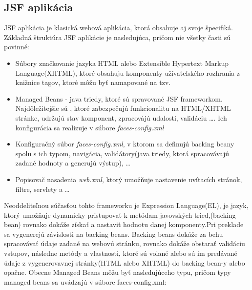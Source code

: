 \subsection{JSF aplikácia}
JSF aplikácia je klasická webová aplikácia, ktorá obsahuje aj svoje špecifiká. Základná štruktúra JSF aplikácie je nasledujúca, pričom nie všetky časti sú povinné:
\begin{itemize}
\item Súbory značkovanie jazyka HTML alebo Extensible Hypertext Markup Language(XHTML)\cite{xhtmlbook}, ktoré obsahuju komponenty užívateľského rozhrania z knižnice tagov, ktoré môžu byť namapované na tzv. 
\item Managed Beans - java triedy, ktoré sú spravované JSF frameworkom. Najdôležitejšie sú , ktoré zabezpečujú funkcionalitu na HTML/XHTML stránke, udržujú stav komponent, zpracovájú udalosti, validáciu \ldots. Ich konfigurácia sa realizuje v súbore \emph{faces-config.xml}
\item Konfiguračný súbor \emph{faces-config.xml}, v ktorom sa definujú backing beany spolu s ich typom, navigácia, validátory(java triedy, ktorá spracovávajú zadané hodnoty a generujú výstup), \ldots
\item Popisovač nasadenia \emph{web.xml}, ktorý umožňuje nastavenie uvítacích stránok, filtre, servlety a \ldots
\end{itemize}
Neoddeliteľnou súčasťou tohto frameworku je Expression Language(EL), je jazyk, ktorý umožňuje dynamicky pristupovať k metódam javovských tried,(backing bean) rovnako dokáže získať a nastaviť hodnotu danej komponenty.Pri preklade sa vygenerejú závislosti na backing beans. Backing beans dokáže za behu spracovávať údaje zadané na webovú stránku, rovnako dokáže obstarať validáciu vstupov,  následne metódy a vlastnosti, ktoré sú volané alebo sú im predávané údaje z vygenerovavnej stránky(HTML alebo XHTML) do backing bean-y alebo opačne. \newline \indent Obecne Managed Beans môžu byť nasledujúceho typu, pričom typy managed beans sa uvádzajú v súbore faces-config.xml:
